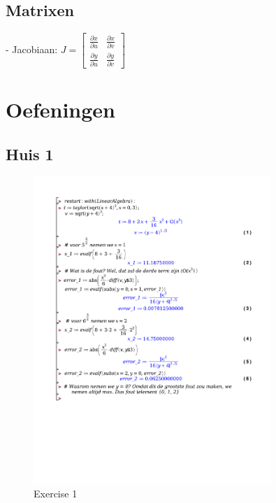 \documentclass[a4paper]{report}
\begin{document}
\subsection*{Matrixen}

- Jacobiaan: $J = \begin{bmatrix} \frac{\partial x}{\partial u} & \frac{\partial x}{\partial v} \\ \frac{\partial y}{\partial u} & \frac{\partial y}{\partial v} \end{bmatrix}$

\section*{Oefeningen}

\subsection*{Huis 1}

\begin{figure}[H]
	\centering
	\includegraphics[width=0.8\textwidth]{./exercises/huis_1_ex_1.pdf}
	\caption{Exercise 1}
\end{figure}
\end{document}
